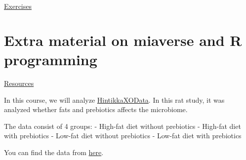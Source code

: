 \documentclass[
  oneside]{book}
\begin{document}
\href{https://microbiome.github.io/OMA/exercises.html}{Exercises}

\hypertarget{extra-material-on-miaverse-and-r-programming}{%
\section{Extra material on miaverse and R programming}\label{extra-material-on-miaverse-and-r-programming}}

\href{https://microbiome.github.io/OMA/resources.html}{Resources}

In this course, we will analyze \href{https://rdrr.io/github/microbiome/microbiomeDataSets/man/HintikkaXOData.html}{HintikkaXOData}.
In this rat study, it was analyzed whether fats and prebiotics affects the microbiome.

The data consist of 4 groups:
- High-fat diet without prebiotics
- High-fat diet with prebiotics
- Low-fat diet without prebiotics
- Low-fat diet with prebiotics

You can find the data from \href{https://github.com/microbiome/course_2022_oulu/tree/main/data}{here}.

  
\end{document}
